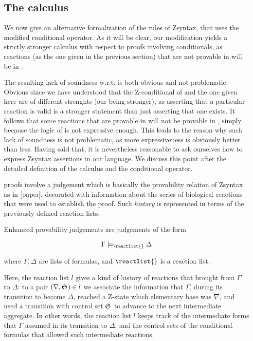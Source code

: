 \subsection{The calculus \eznd{}}

We now give an alternative formalization of the rules of Zsyntax, that uses the
modified conditional operator.
As it will be clear, our modification yields a strictly stronger calculus with
respect to proofs involving conditionals, as reactions (as the one given in the
previous section) that are not provable in \znd{} will be in \eznd{}.

The resulting lack of soundness w.r.t. \znd{} is both obvious and not
problematic. Obvious since we have understood that the Z-conditional of \znd{} and
the one given here are of different strenghts (our being stronger), as asserting
that a particular reaction is valid is a stronger statement than just asserting
that one exists. It follows that some reactions that are provable in \eznd{}
will not be provable in \znd{}, simply because the logic of \znd{} is not
expressive enough. This leads to the reason why such lack of soundness is not
problematic, as more expressiveness is obviously better than less.
Having said that, it is nevertheless reasonable to ask ourselves how to express
Zsyntax assertions in our language. We discuss this point after the detailed
definition of the calculus and the conditional operator.

\eznd{} proofs involve a judgement which is basically the provability relation
of Zsyntax as in [paper], decorated with information about the series of
biological reactions that were used to establish the proof. Such \emph{history}
is represented in terms of the previously defined reaction lists.

\begin{definition}
  Enhanced provability judgements are judgements of the form

  \[
    \Gamma \models_{\reactlist{}} \Delta
  \]

  where $\Gamma, \Delta$ are lists of formulas, and $\reactlist{}$ is a reaction
  list.
\end{definition}

Here, the reaction list $l$ gives a kind of history of reactions that brought
from $\Gamma$ to $\Delta$: to a pair $(\nabla, \mathfrak{S}_{}) \in l$ we associate
the information that $\Gamma$, during its transition to become $\Delta$, reached
a Z-state which elementary base was $\nabla$, and used a transition with
control set $\mathfrak{S}_{}$ to advance to the next intermediate aggregate.
In other words, the reaction list $l$ keeps track of the intermediate forms that
$\Gamma$ assumed in its transition to $\Delta$, and the control sets of the
conditional formulas that allowed such intermediate reactions.

